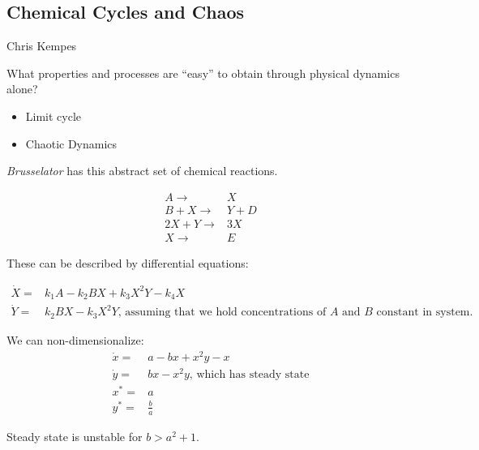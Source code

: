 \documentclass[]{article}
\begin{document}
\cite[19.S, Nucleic Acids (Summary)]{brown2009chemistry}
\subsection{Chemical Cycles and Chaos}

Chris Kempes

What properties and processes are “easy” to obtain
through physical dynamics alone?
\begin{itemize}
	\item Limit cycle
	\item Chaotic Dynamics
\end{itemize}


\textit{Brusselator} has this abstract set of chemical reactions.

\begin{align*}
A \rightarrow& X\\
B + X \rightarrow& Y + D\\
2X + Y \rightarrow& 3X \\
X \rightarrow& E
\end{align*}

These can be described by differential equations:

\begin{align*}
\dot X =& k_1 A - k_2 B X + k_3 X^2 Y -k_4 X\\
\dot Y =& k_2 B X -k_3 X^2 Y\text{, assuming that we hold concentrations of $A$ and $B$ constant in system.}  
\end{align*}

We can non-dimensionalize:
\begin{align*}
\dot x =& a - b x +x^2 y -x\\
\dot y =& bx - x^2 y\text{, which has steady state}\\
x^* =& a\\
y^* =& \frac{b}{a}
\end{align*}

Steady state is unstable for $b>a^2+1$. 
\end{document}
